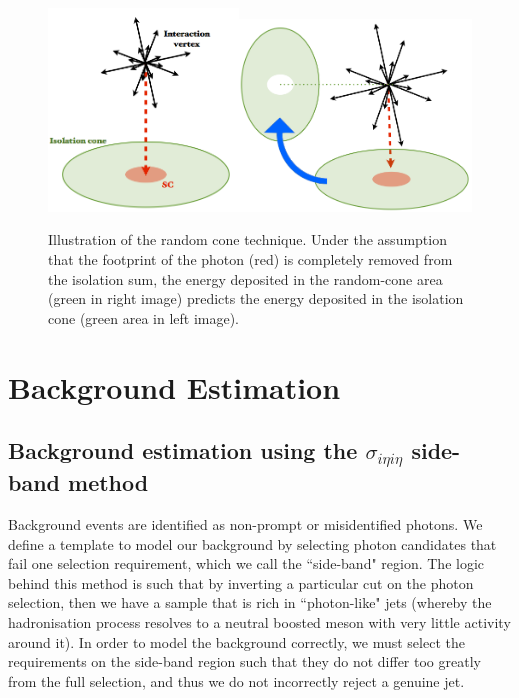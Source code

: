 \begin{figure} 
\begin{center}
\includegraphics[width=0.45\textwidth]{Figures/RandomCone1.png}\includegraphics[width=0.55\textwidth]{Figures/RandomCone2.png}
\end{center}
\caption{Illustration of the random cone technique. Under the assumption that the footprint of the photon (red) is completely removed from the isolation sum, the energy deposited in the random-cone area (green in right image) predicts the energy deposited in the isolation cone (green area in left image). \cite{MarcoThesis}}
\label{fig-RandomConeIsolation}
\end{figure}

\section{Background Estimation} \label{sec-BackgroundEstimation}

\subsection{Background estimation using the $\sigma_{i \eta i \eta}$ side-band method} 

Background events are identified as non-prompt or misidentified photons. We define a template to model our background by selecting photon candidates that fail one selection requirement, which we call the ``side-band" region. The logic behind this method is such that by inverting a particular cut on the photon selection, then we have a sample that is rich in ``photon-like" jets (whereby the hadronisation process resolves to a neutral boosted meson with very little activity around it). In order to model the background correctly, we must select the requirements on the side-band region such that they do not differ too greatly from the full selection, and thus we do not incorrectly reject a genuine jet. 

